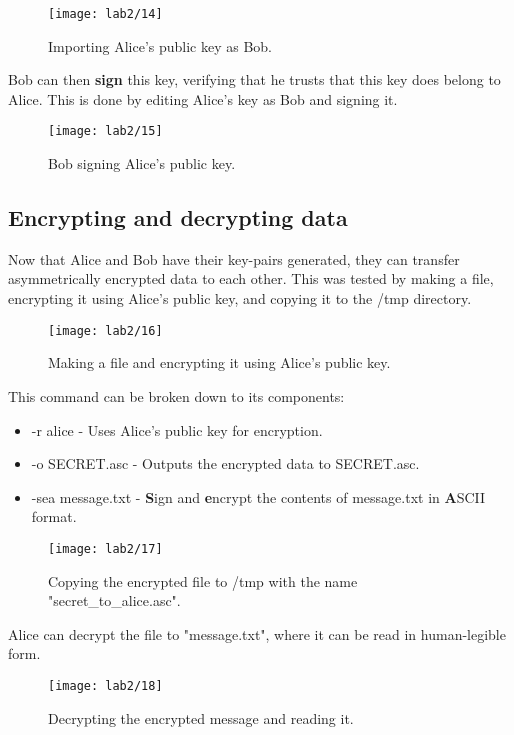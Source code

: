 \begin{figure}[H]
    \centering
    \texttt{[image: lab2/14]}
    \caption{Importing Alice's public key as Bob.}
    \label{fig:importAlice}
\end{figure}

\pagebreak

\noindent Bob can then \textbf{sign} this key, verifying that he trusts that this key does belong to Alice.
This is done by editing Alice's key as Bob and signing it.

\begin{figure}[H]
    \centering
    \texttt{[image: lab2/15]}
    \caption{Bob signing Alice's public key.}
    \label{fig:signAliceKey}
\end{figure}

\pagebreak

\subsection{Encrypting and decrypting data}\label{subsec:encrDecr}
Now that Alice and Bob have their key-pairs generated, they can transfer asymmetrically encrypted data to each other.
This was tested by making a file, encrypting it using Alice's public key, and copying it to the /tmp directory.

\begin{figure}[H]
    \centering
    \texttt{[image: lab2/16]}
    \caption{Making a file and encrypting it using Alice's public key.}
    \label{fig:encLab2Msg}
\end{figure}

This command can be broken down to its components:
\begin{itemize}
    \item -r alice - Uses Alice's public key for encryption.
    \item -o SECRET.asc - Outputs the encrypted data to SECRET.asc.
    \item -sea message.txt - \textbf{S}ign and \textbf{e}ncrypt the contents of message.txt in \textbf{A}SCII format.
\end{itemize}

\begin{figure}[H]
    \centering
    \texttt{[image: lab2/17]}
    \caption{Copying the encrypted file to /tmp with the name "secret\_to\_alice.asc".}
    \label{fig:copyLab2Msg}
\end{figure}

Alice can decrypt the file to "message.txt", where it can be read in human-legible form.

\begin{figure}[H]
    \centering
    \texttt{[image: lab2/18]}
    \caption{Decrypting the encrypted message and reading it.}
    \label{fig:decryptLab2Msg}
\end{figure}
